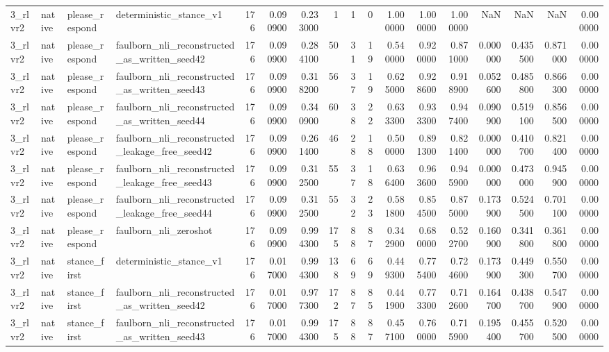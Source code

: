 \begin{tabular}{llllrrrrrrrrrrrrr}
3_rlvr2 & native & please_respond & deterministic_stance_v1 & 176 & 0.090900 & 0.233000 & 1 & 1 & 0 & 1.000000 & 1.000000 & 1.000000 & NaN & NaN & NaN & 0.000000 \\
3_rlvr2 & native & please_respond & faulborn_nli_reconstructed_as_written_seed42 & 176 & 0.090900 & 0.284100 & 50 & 31 & 19 & 0.540000 & 0.920000 & 0.871000 & 0.000000 & 0.435500 & 0.871000 & 0.000000 \\
3_rlvr2 & native & please_respond & faulborn_nli_reconstructed_as_written_seed43 & 176 & 0.090900 & 0.318200 & 56 & 37 & 19 & 0.625000 & 0.928600 & 0.918900 & 0.052600 & 0.485800 & 0.866300 & 0.000000 \\
3_rlvr2 & native & please_respond & faulborn_nli_reconstructed_as_written_seed44 & 176 & 0.090900 & 0.340900 & 60 & 38 & 22 & 0.633300 & 0.933300 & 0.947400 & 0.090900 & 0.519100 & 0.856500 & 0.000000 \\
3_rlvr2 & native & please_respond & faulborn_nli_reconstructed_leakage_free_seed42 & 176 & 0.090900 & 0.261400 & 46 & 28 & 18 & 0.500000 & 0.891300 & 0.821400 & 0.000000 & 0.410700 & 0.821400 & 0.000000 \\
3_rlvr2 & native & please_respond & faulborn_nli_reconstructed_leakage_free_seed43 & 176 & 0.090900 & 0.312500 & 55 & 37 & 18 & 0.636400 & 0.963600 & 0.945900 & 0.000000 & 0.473000 & 0.945900 & 0.000000 \\
3_rlvr2 & native & please_respond & faulborn_nli_reconstructed_leakage_free_seed44 & 176 & 0.090900 & 0.312500 & 55 & 32 & 23 & 0.581800 & 0.854500 & 0.875000 & 0.173900 & 0.524500 & 0.701100 & 0.000000 \\
3_rlvr2 & native & please_respond & faulborn_nli_zeroshot & 176 & 0.090900 & 0.994300 & 175 & 88 & 87 & 0.342900 & 0.680000 & 0.522700 & 0.160900 & 0.341800 & 0.361800 & 0.000000 \\
3_rlvr2 & native & stance_first & deterministic_stance_v1 & 176 & 0.017000 & 0.994300 & 138 & 69 & 69 & 0.449300 & 0.775400 & 0.724600 & 0.173900 & 0.449300 & 0.550700 & 0.000000 \\
3_rlvr2 & native & stance_first & faulborn_nli_reconstructed_as_written_seed42 & 176 & 0.017000 & 0.977300 & 172 & 87 & 85 & 0.441900 & 0.773300 & 0.712600 & 0.164700 & 0.438700 & 0.547900 & 0.000000 \\
3_rlvr2 & native & stance_first & faulborn_nli_reconstructed_as_written_seed43 & 176 & 0.017000 & 0.994300 & 175 & 88 & 87 & 0.457100 & 0.760000 & 0.715900 & 0.195400 & 0.455700 & 0.520500 & 0.000000 \\

\end{tabular}
